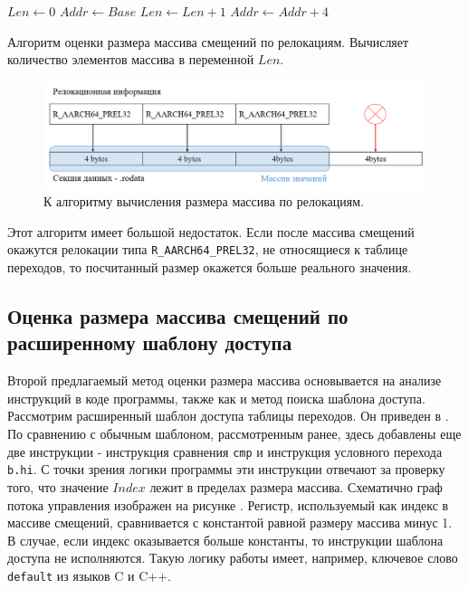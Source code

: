 \documentclass{mipt-thesis-bs}
\begin{document}
    \begin{algorithm}
    \begin{algorithmic}
        \State $Len \gets 0$
        \State $Addr \gets Base$
            \State $Len \gets Len + 1$
            \State $Addr \gets Addr + 4$
        \EndWhile
    \end{algorithmic}
    \caption{Алгоритм оценки размера массива смещений по релокациям. Вычисляет количество элементов массива в переменной $Len$.}
    \label{alg:reloc_cat_estimate}
    \end{algorithm}

    \begin{figure}[h!]
        \centering
        \includegraphics[width=\textwidth]{pics/reloc_cat_estimate.png}
        \caption{К алгоритму вычисления размера массива по релокациям.}
        \label{fig:reloc_cat_estimate}
    \end{figure}

    Этот алгоритм имеет большой недостаток. Если после массива смещений окажутся релокации типа \verb|R_AARCH64_PREL32|, не относящиеся к таблице переходов, то посчитанный размер окажется больше реального значения.

    \subsection{Оценка размера массива смещений по расширенному шаблону доступа} \label{sec:template_estimate}

    Второй предлагаемый метод оценки размера массива основывается на анализе инструкций в коде программы, также как и метод поиска шаблона доступа. Рассмотрим расширенный шаблон доступа таблицы переходов. Он приведен в . По сравнению с обычным шаблоном, рассмотренным ранее, здесь добавлены еще две инструкции - инструкция сравнения \verb|cmp| и инструкция условного перехода \verb|b.hi|. С точки зрения логики программы эти инструкции отвечают за проверку того, что значение $Index$ лежит в пределах размера массива. Схематично граф потока управления изображен на рисунке . Регистр, используемый как индекс в массиве смещений, сравнивается с константой равной размеру массива минус 1. В случае, если индекс оказывается больше константы, то инструкции шаблона доступа не исполняются. Такую логику работы имеет, например, ключевое слово \verb|default| из языков C и C++.
\end{document}
